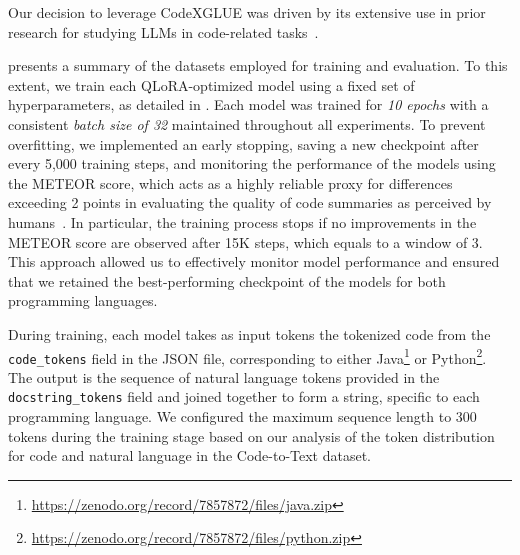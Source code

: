Our decision to leverage CodeXGLUE was driven by its extensive use in prior research for studying LLMs in code-related tasks~\cite{wu2022learning,mastropaolo2022using,mastropaolo2021empirical,shi2022evaluation,chen2024code}. 

 presents a summary of the datasets employed
for training and evaluation. To this extent, we train each QLoRA-optimized model using a fixed set of hyperparameters, as detailed in . Each model was trained for \textit{10 epochs} with a consistent \textit{batch size of 32} maintained throughout all experiments. To prevent overfitting, we implemented an early stopping, saving a new checkpoint after every 5,000 training steps, and monitoring the performance of the models using the METEOR score, which acts as a highly reliable proxy for differences exceeding 2 points in evaluating the quality of code summaries as perceived by humans~\cite{roy2021reassessing}.
In particular, the training process stops if no improvements in the METEOR score are observed after 15K steps, which equals to a window of 3. This approach allowed us to effectively monitor model performance and ensured that we retained the best-performing checkpoint of the models for both programming languages.

\vspace{-5pt}
\begin{table}[h!]
	\centering
	\caption{\#Number of Data Instances in Training, Validation, and Testing Splits}
	\label{tab:datasets}
\end{table}

During training, each model takes as input tokens the tokenized code from the \texttt{code\_tokens} field in the JSON file, corresponding to either Java\footnote{\url{https://zenodo.org/record/7857872/files/java.zip}} or Python\footnote{\url{https://zenodo.org/record/7857872/files/python.zip}}. The output is the sequence of natural language tokens provided in the \texttt{docstring\_tokens} field and joined together to form a string, specific to each programming language. 
We configured the maximum sequence length to 300 tokens during the training stage based on our analysis of the token distribution for code and natural language in the Code-to-Text dataset.



